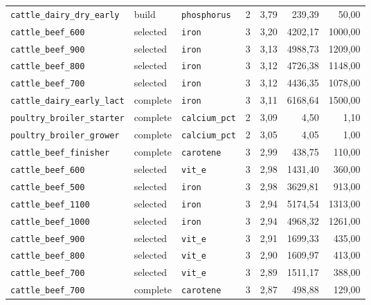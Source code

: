 \documentclass[11pt]{article}
\begin{document}
\begin{longtable}{lllccrr}
\texttt{cattle\_dairy\_dry\_early} & build & \texttt{phosphorus} & 2 & 3{,}79 & 239{,}39 & 50{,}00 \\
\texttt{cattle\_beef\_600} & selected & \texttt{iron} & 3 & 3{,}20 & 4202{,}17 & 1000{,}00 \\
\texttt{cattle\_beef\_900} & selected & \texttt{iron} & 3 & 3{,}13 & 4988{,}73 & 1209{,}00 \\
\texttt{cattle\_beef\_800} & selected & \texttt{iron} & 3 & 3{,}12 & 4726{,}38 & 1148{,}00 \\
\texttt{cattle\_beef\_700} & selected & \texttt{iron} & 3 & 3{,}12 & 4436{,}35 & 1078{,}00 \\
\texttt{cattle\_dairy\_early\_lact} & complete & \texttt{iron} & 3 & 3{,}11 & 6168{,}64 & 1500{,}00 \\
\texttt{poultry\_broiler\_starter} & complete & \texttt{calcium\_pct} & 2 & 3{,}09 & 4{,}50 & 1{,}10 \\
\texttt{poultry\_broiler\_grower} & complete & \texttt{calcium\_pct} & 2 & 3{,}05 & 4{,}05 & 1{,}00 \\
\texttt{cattle\_beef\_finisher} & complete & \texttt{carotene} & 3 & 2{,}99 & 438{,}75 & 110{,}00 \\
\texttt{cattle\_beef\_600} & selected & \texttt{vit\_e} & 3 & 2{,}98 & 1431{,}40 & 360{,}00 \\
\texttt{cattle\_beef\_500} & selected & \texttt{iron} & 3 & 2{,}98 & 3629{,}81 & 913{,}00 \\
\texttt{cattle\_beef\_1100} & selected & \texttt{iron} & 3 & 2{,}94 & 5174{,}54 & 1313{,}00 \\
\texttt{cattle\_beef\_1000} & selected & \texttt{iron} & 3 & 2{,}94 & 4968{,}32 & 1261{,}00 \\
\texttt{cattle\_beef\_900} & selected & \texttt{vit\_e} & 3 & 2{,}91 & 1699{,}33 & 435{,}00 \\
\texttt{cattle\_beef\_800} & selected & \texttt{vit\_e} & 3 & 2{,}90 & 1609{,}97 & 413{,}00 \\
\texttt{cattle\_beef\_700} & selected & \texttt{vit\_e} & 3 & 2{,}89 & 1511{,}17 & 388{,}00 \\
\texttt{cattle\_beef\_700} & complete & \texttt{carotene} & 3 & 2{,}87 & 498{,}88 & 129{,}00 \\
\end{longtable}
\end{document}
